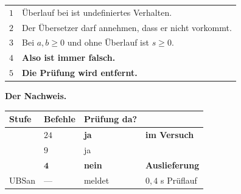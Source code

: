 \begin{merksatz}
\begin{center}
\renewcommand{\arraystretch}{1.5}
\begin{tabular}{@{}P{1.2cm}P{7.4cm}@{}}
\toprule
$1$ & Überlauf bei  ist undefiniertes Verhalten.\\
$2$ & Der Übersetzer darf annehmen, dass er nicht vorkommt.\\
$3$ & Bei $a, b \ge 0$ und ohne Überlauf ist $s \ge 0$.\\
$4$ & \textbf{Also ist  immer falsch.}\\
$5$ & \textbf{Die Prüfung wird entfernt.}\\
\bottomrule
\end{tabular}
\end{center}

\begin{center}
\begin{minipage}{0.88\textwidth}
\end{minipage}
\end{center}

\textbf{Der Nachweis.}

\begin{center}
\renewcommand{\arraystretch}{1.45}
\begin{tabular}{@{}P{2.2cm}P{2.0cm}P{2.4cm}P{2.2cm}@{}}
\toprule
\textbf{Stufe} & \textbf{Befehle} & \textbf{Prüfung da?} & \\
\midrule
{} & $24$ & \textcolor{gruen}{\textbf{ja}} & \textbf{im Versuch}\\
 & $9$ & \textcolor{gruen}{ja} & \\
 & $\mathbf{4}$ & \textcolor{akzent}{\textbf{nein}} & \textcolor{akzent}{\textbf{Aus\-lieferung}}\\
UBSan & --- & \textcolor{gruen}{meldet} & \textcolor{gruen}{$0{,}4$ s Prüflauf}\\
\bottomrule
\end{tabular}
\end{center}

\begin{center}
\end{center}
\end{merksatz}

